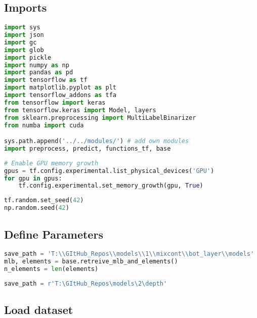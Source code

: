 \hypertarget{imports}{%
\subsection{Imports}\label{imports}}

\begin{lstlisting}[language=Python]
import sys
import json
import gc
import glob
import pickle
import numpy as np
import pandas as pd
import tensorflow as tf
import matplotlib.pyplot as plt
import tensorflow_addons as tfa
from tensorflow import keras
from tensorflow.keras import Model, layers
from sklearn.preprocessing import MultiLabelBinarizer
from numba import cuda

sys.path.append('../../modules/') # add own modules
import preprocess, predict, functions_tf, base
\end{lstlisting}

\begin{lstlisting}[language=Python]
# Enable GPU memory growth
gpus = tf.config.experimental.list_physical_devices('GPU')
for gpu in gpus:
    tf.config.experimental.set_memory_growth(gpu, True)
\end{lstlisting}

\begin{lstlisting}[language=Python]
tf.random.set_seed(42)
np.random.seed(42)
\end{lstlisting}

\hypertarget{define-parameters}{%
\subsection{Define Parameters}\label{define-parameters}}

\begin{lstlisting}[language=Python]
save_path = 'T:\\GItHub_Repos\\models\\1\\mixcont\\bot_layer\\models'
mlb, elements = base.retreive_mlb_and_elements()
n_elements = len(elements)
\end{lstlisting}

\begin{lstlisting}[language=Python]
save_path = r'T:\GItHub_Repos\models\2\depth'
\end{lstlisting}

\hypertarget{load-dataset}{%
\subsection{Load dataset}\label{load-dataset}}

